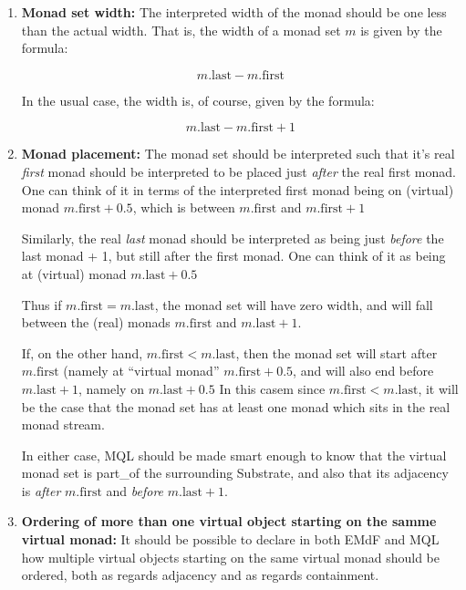 \documentclass[a4paper,12pt]{article}
\begin{document}
\begin{enumerate}
  \item \textbf{Monad set width:} The interpreted width of the monad
    should be one less than the actual width.  That is, the width of a
    monad set $m$ is given by the formula:

    \[m.\mathrm{last} - m.\mathrm{first}\]
    
    In the usual case, the width is, of course, given by the formula:
    
    \[m.\mathrm{last} - m.\mathrm{first} + 1\]

    \item \textbf{Monad placement:} The monad set should be
      interpreted such that it's real \textit{first} monad should be
      interpreted to be placed just \textit{after} the real first
      monad.  One can think of it in terms of the interpreted first
      monad being on (virtual) monad $m.\mathrm{first} + 0.5$, which
      is between $m.\mathrm{first}$ and $m.\mathrm{first} + 1$
      
      Similarly, the real \textit{last} monad should be interpreted as
      being just \textit{before} the last monad + 1, but still after
      the first monad.  One can think of it as being at (virtual)
      monad $m.\mathrm{last} + 0.5$

      Thus if $m.\mathrm{first} = m.\mathrm{last}$, the monad set will
      have zero width, and will fall between the (real) monads
      $m.\mathrm{first}$ and $m.\mathrm{last} + 1$.

      If, on the other hand, $m.\mathrm{first} < m.\mathrm{last}$,
      then the monad set will start after $m.\mathrm{first}$ (namely
      at ``virtual monad'' $m.\mathrm{first} + 0.5$, and will also end
      before $m.\mathrm{last} + 1$, namely on $m.\mathrm{last} + 0.5$
      In this casem since $m.\mathrm{first} < m.\mathrm{last}$, it
      will be the case that the monad set has at least one monad which
      sits in the real monad stream.

      In either case, MQL should be made smart enough to know that the
      virtual monad set is part\_of the surrounding Substrate, and
      also that its adjacency is \textit{after} $m.\mathrm{first}$ and
      \textit{before} $m.\mathrm{last} + 1$.

      \item \textbf{Ordering of more than one virtual object starting
        on the samme virtual monad:} It should be possible to declare
        in both EMdF and MQL how multiple virtual objects starting on
        the same virtual monad should be ordered, both as regards
        adjacency and as regards containment.


\end{enumerate}
\end{document}
